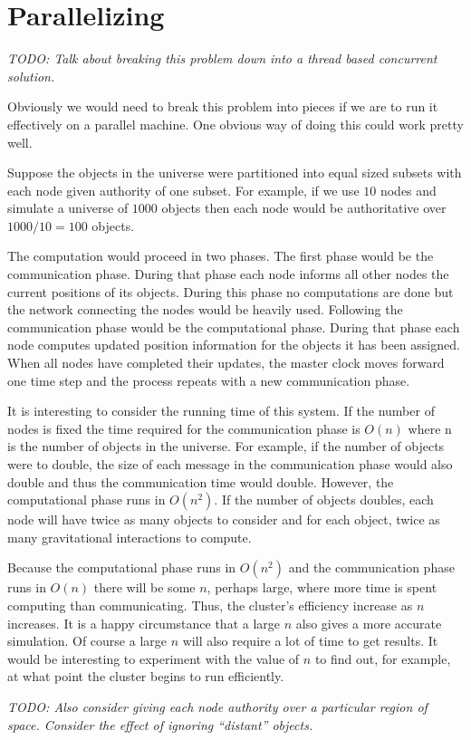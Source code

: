 
\section{Parallelizing}
\label{sec:parallelizing}

\textit{TODO: Talk about breaking this problem down into a thread based concurrent solution.}

Obviously we would need to break this problem into pieces if we are to run it effectively on a
parallel machine. One obvious way of doing this could work pretty well.

Suppose the objects in the universe were partitioned into equal sized subsets with each node
given authority of one subset. For example, if we use $10$ nodes and simulate a universe of
$1000$ objects then each node would be authoritative over $1000/10 = 100$ objects.

The computation would proceed in two phases. The first phase would be the communication phase.
During that phase each node informs all other nodes the current positions of its objects. During
this phase no computations are done but the network connecting the nodes would be heavily used.
Following the communication phase would be the computational phase. During that phase each node
computes updated position information for the objects it has been assigned. When all nodes have
completed their updates, the master clock moves forward one time step and the process repeats
with a new communication phase.

It is interesting to consider the running time of this system. If the number of nodes is fixed
the time required for the communication phase is $O(n)$ where n is the number of objects in the
universe. For example, if the number of objects were to double, the size of each message in the
communication phase would also double and thus the communication time would double. However, the
computational phase runs in $O(n^2)$. If the number of objects doubles, each node will have
twice as many objects to consider and for each object, twice as many gravitational interactions
to compute.

Because the computational phase runs in $O(n^2)$ and the communication phase runs in $O(n)$
there will be some $n$, perhaps large, where more time is spent computing than communicating.
Thus, the cluster's efficiency increase as $n$ increases. It is a happy circumstance that a large
$n$ also gives a more accurate simulation. Of course a large $n$ will also require a lot of time
to get results. It would be interesting to experiment with the value of $n$ to find out, for
example, at what point the cluster begins to run efficiently.

\textit{TODO: Also consider giving each node authority over a particular region of space.
  Consider the effect of ignoring ``distant'' objects.}
